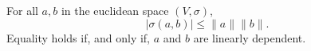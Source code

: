 For all $a, b$ in the euclidean space $(V, \sigma)$,
$$|\sigma(a, b)| \leq \|a\| \|b\|.$$
Equality holds if, and only if, $a$ and $b$ are linearly dependent.
